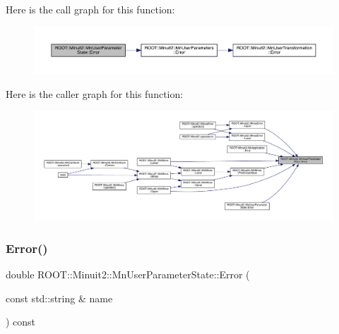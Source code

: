 Here is the call graph for this function\+:\nopagebreak
\begin{figure}[H]
\begin{center}
\leavevmode
\includegraphics[width=350pt]{d3/de0/classROOT_1_1Minuit2_1_1MnUserParameterState_a16a0c68e252a3fbc3ceb0f41934e376e_cgraph}
\end{center}
\end{figure}
Here is the caller graph for this function\+:\nopagebreak
\begin{figure}[H]
\begin{center}
\leavevmode
\includegraphics[width=350pt]{d3/de0/classROOT_1_1Minuit2_1_1MnUserParameterState_a16a0c68e252a3fbc3ceb0f41934e376e_icgraph}
\end{center}
\end{figure}
\mbox{\label{classROOT_1_1Minuit2_1_1MnUserParameterState_a74ae393362454df2808936090391560f}} 
\subsubsection{\texorpdfstring{Error()}{Error()}\hspace{0.1cm}{\footnotesize\ttfamily [3/4]}}
{\footnotesize\ttfamily double R\+O\+O\+T\+::\+Minuit2\+::\+Mn\+User\+Parameter\+State\+::\+Error (\begin{DoxyParamCaption}\item[{const std\+::string \&}]{name }\end{DoxyParamCaption}) const}

